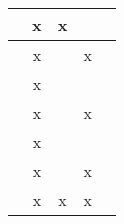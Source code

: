 \begin{table}[h]
\begin{tabular}{|l|l|l|l|l|}
		\cite{solano2019modeling}                                   & \multicolumn{1}{c|}{x}                                         & \multicolumn{1}{c|}{x}                                               & \multicolumn{1}{c|}{}                                              & \multicolumn{1}{c|}{}                                               \\ \hline
		\cite{Zaza2016}                                   & \multicolumn{1}{c|}{x}                                         & \multicolumn{1}{c|}{}                                               & \multicolumn{1}{c|}{x}                                              & \multicolumn{1}{c|}{}                                               \\ \hline
		\cite{Wang2016, Wang2017}                                   & \multicolumn{1}{c|}{x}                                         & \multicolumn{1}{c|}{}                                               & \multicolumn{1}{c|}{}                                              & \multicolumn{1}{c|}{}                                               \\ \hline
		\cite{FANG2017}                                   & \multicolumn{1}{c|}{x}                                         & \multicolumn{1}{c|}{}                                               & \multicolumn{1}{c|}{x}                                              & \multicolumn{1}{c|}{}                                               \\ \hline
		\cite{Qiao2017}                                   & \multicolumn{1}{c|}{x}                                         & \multicolumn{1}{c|}{}                                               & \multicolumn{1}{c|}{}                                              & \multicolumn{1}{c|}{}                                               \\ \hline
		\cite{Flemisch2011}                                   & \multicolumn{1}{c|}{x}                                         & \multicolumn{1}{c|}{}                                               & \multicolumn{1}{c|}{x}                                              & \multicolumn{1}{c|}{}                                               \\ \hline
		\cite{Cao2002}                                   & \multicolumn{1}{c|}{x}                                         & \multicolumn{1}{c|}{x}                                               & \multicolumn{1}{c|}{x}                                              & \multicolumn{1}{c|}{}                                               \\ \hline

\end{tabular}
\end{table}
